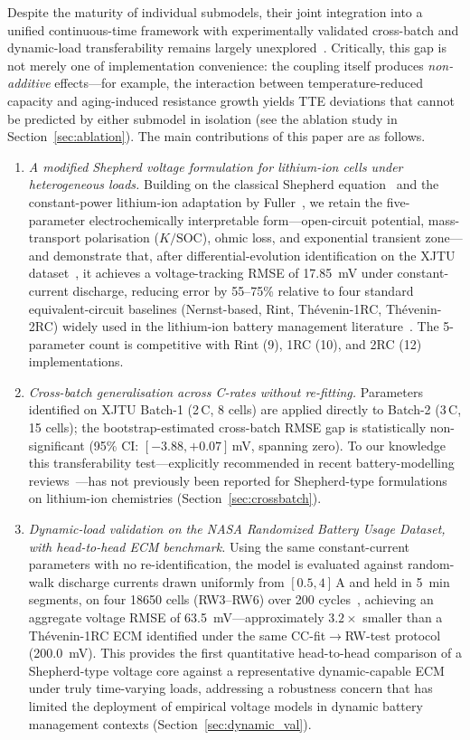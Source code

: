 \documentclass[5p,times,number]{elsarticle}
\newcommand{\secref}[1]{\hyperref[#1]{\textup{Section~\ref*{#1}}}}
\def\secref#1{Section~\ref{#1}}
\begin{document}
Despite the maturity of individual submodels, their joint integration into a unified continuous-time framework with experimentally validated cross-batch and dynamic-load transferability remains largely unexplored~\cite{Tian2019,Xiong2018,Mama2025,Wang2020RSER}.
Critically, this gap is not merely one of implementation convenience: the coupling itself produces \emph{non-additive} effects---for example, the interaction between temperature-reduced capacity and aging-induced resistance growth yields TTE deviations that cannot be predicted by either submodel in isolation (see the ablation study in \secref{sec:ablation}).
The main contributions of this paper are as follows.
\begin{enumerate}[leftmargin=*, label=\arabic*.]
    \item \textit{A modified Shepherd voltage formulation for lithium-ion cells under heterogeneous loads.}
    Building on the classical Shepherd equation~\cite{Shepherd1965} and the constant-power lithium-ion adaptation by Fuller~\cite{Fuller2014}, we retain the five-parameter electrochemically interpretable form---open-circuit potential, mass-transport polarisation ($K/\mathrm{SOC}$), ohmic loss, and exponential transient zone---and demonstrate that, after differential-evolution identification on the XJTU dataset~\cite{XJTU2020}, it achieves a voltage-tracking RMSE of \SI{17.85}{\milli\volt} under constant-current discharge, reducing error by 55--75\% relative to four standard equivalent-circuit baselines (Nernst-based, Rint, Th\'{e}venin-1RC, Th\'{e}venin-2RC) widely used in the lithium-ion battery management literature~\cite{Hu2012,Plett2004,You2018}.
    The 5-parameter count is competitive with Rint (9), 1RC (10), and 2RC (12) implementations.
    \item \textit{Cross-batch generalisation across C-rates without re-fitting.}
    Parameters identified on XJTU Batch-1 (2\,C, 8 cells) are applied directly to Batch-2 (3\,C, 15 cells); the bootstrap-estimated cross-batch RMSE gap is statistically non-significant (95\% CI: $[-3.88, +0.07]$\,mV, spanning zero).
    To our knowledge this transferability test---explicitly recommended in recent battery-modelling reviews~\cite{Xiong2018,Wang2020RSER}---has not previously been reported for Shepherd-type formulations on lithium-ion chemistries (\secref{sec:crossbatch}).
    \item \textit{Dynamic-load validation on the NASA Randomized Battery Usage Dataset, with head-to-head ECM benchmark.}
    Using the same constant-current parameters with no re-identification, the model is evaluated against random-walk discharge currents drawn uniformly from $[0.5, 4]$\,A and held in \SI{5}{\minute} segments, on four 18650 cells (RW3--RW6) over 200 cycles~\cite{Bole2014}, achieving an aggregate voltage RMSE of \SI{63.5}{\milli\volt}---approximately $3.2\times$ smaller than a Th\'{e}venin-1RC ECM identified under the same CC-fit$\to$RW-test protocol (\SI{200.0}{\milli\volt}). This provides the first quantitative head-to-head comparison of a Shepherd-type voltage core against a representative dynamic-capable ECM under truly time-varying loads, addressing a robustness concern that has limited the deployment of empirical voltage models in dynamic battery management contexts (\secref{sec:dynamic_val}).

\end{enumerate}
\end{document}
